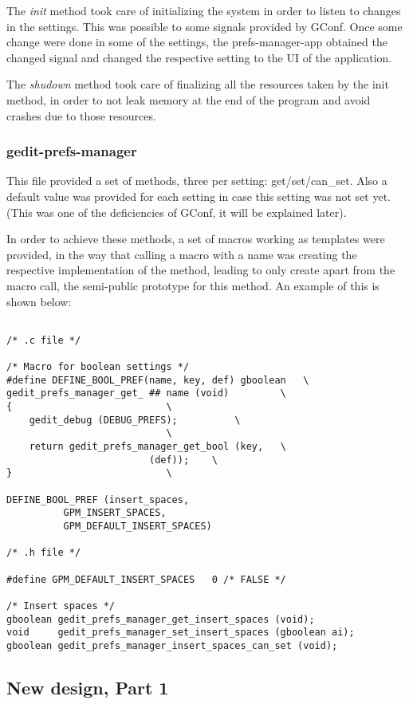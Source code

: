 The \emph{init} method took care of initializing the system in order to listen to changes in the settings. This was possible to some signals provided by GConf. Once some change were done in some of the settings, the prefs-manager-app obtained the changed signal and changed the respective setting to the UI of the application.

The \emph{shudown} method took care of finalizing all the resources taken by the init method, in order to not leak memory at the end of the program and avoid crashes due to those resources.

\subsubsection*{gedit-prefs-manager}

This file provided  a set of methods, three per setting: get/set/can\_set. Also a default value was provided for each setting in case this setting was not set yet. (This was one of the deficiencies of GConf, it will be explained later).

In order to achieve these methods, a set of macros working as templates were provided, in the way that calling a macro with a name was creating the respective implementation of the method, leading to only create apart from the macro call, the semi-public prototype for this method. An example of this is shown below:

\begin{lstlisting}[style=GObject]

/* .c file */

/* Macro for boolean settings */
#define DEFINE_BOOL_PREF(name, key, def) gboolean 	\
gedit_prefs_manager_get_ ## name (void)			\
{							\
	gedit_debug (DEBUG_PREFS);			\
							\
	return gedit_prefs_manager_get_bool (key,	\
					     (def));	\
}							\

DEFINE_BOOL_PREF (insert_spaces,
		  GPM_INSERT_SPACES,
		  GPM_DEFAULT_INSERT_SPACES)

/* .h file */

#define GPM_DEFAULT_INSERT_SPACES	0 /* FALSE */

/* Insert spaces */
gboolean gedit_prefs_manager_get_insert_spaces (void);
void	 gedit_prefs_manager_set_insert_spaces (gboolean ai);
gboolean gedit_prefs_manager_insert_spaces_can_set (void);

\end{lstlisting}

\subsection{New design, Part 1}

